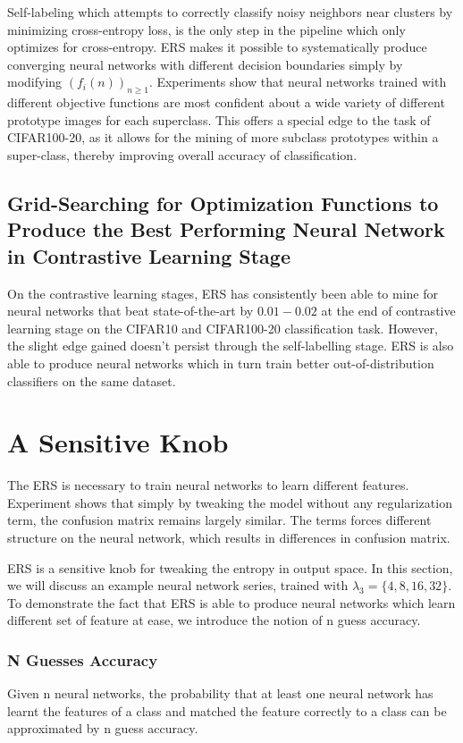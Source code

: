 \documentclass[10pt,twocolumn,letterpaper]{article}
\begin{document}
Self-labeling which attempts to correctly classify noisy neighbors near clusters by minimizing cross-entropy loss, is the only step in the pipeline which only optimizes for cross-entropy. ERS makes it possible to systematically produce converging neural networks with different decision boundaries simply by modifying $(f_{i}(n))_{n \geq 1}$. Experiments show that neural networks trained with different objective functions are most confident about a wide variety of different prototype images for each superclass. This offers a special edge to the task of CIFAR100-20, as it allows for the mining of more subclass prototypes within a super-class, thereby improving overall accuracy of classification.

\subsection{Grid-Searching for Optimization Functions to Produce the Best Performing Neural Network in Contrastive Learning Stage}
On the contrastive learning stages, ERS has consistently been able to mine for neural networks that beat state-of-the-art by $0.01-0.02$ at the end of contrastive learning stage on the CIFAR10 and CIFAR100-20 classification task. However, the slight edge gained doesn't persist through the self-labelling stage. ERS is also able to produce neural networks which in turn train better out-of-distribution classifiers on the same dataset. 

\section{A Sensitive Knob}
The ERS is necessary to train neural networks to learn different features. Experiment shows that simply by tweaking the model without any regularization term, the confusion matrix remains largely similar. The terms forces different structure on the neural network, which results in differences in confusion matrix. 

ERS is a sensitive knob for tweaking the entropy in output space. In this section, we will discuss an example neural network series, trained with $\lambda_{3} = \{ 4, 8, 16, 32\} $. To demonstrate the fact that ERS is able to produce neural networks which learn different set of feature at ease, we introduce the notion of n guess accuracy.  

\subsubsection{N Guesses Accuracy}
Given n neural networks, the probability that at least one neural network has learnt the features of a class and matched the feature correctly to a class can be approximated by n guess accuracy.  
\end{document}
